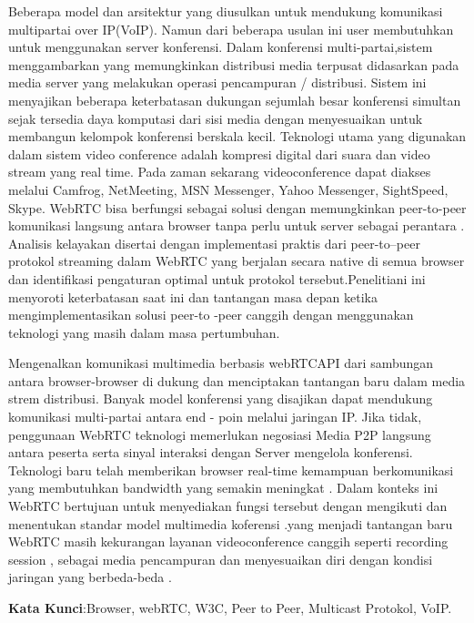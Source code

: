 \documentclass{jtetiproposalskripsi}
\begin{document}
\cover

\approvalpage


\begin{abstractind}
Beberapa model dan arsitektur yang diusulkan untuk mendukung komunikasi multipartai over IP(VoIP). Namun dari beberapa usulan ini user membutuhkan untuk menggunakan server konferensi. Dalam konferensi multi-partai,sistem menggambarkan yang memungkinkan distribusi media terpusat didasarkan pada media server yang melakukan operasi pencampuran / distribusi. Sistem ini menyajikan beberapa keterbatasan dukungan sejumlah besar konferensi simultan sejak tersedia daya komputasi  dari sisi media dengan menyesuaikan untuk membangun kelompok konferensi berskala kecil. Teknologi utama yang digunakan dalam sistem video conference adalah kompresi digital dari suara dan video stream yang real time. Pada zaman sekarang videoconference dapat diakses melalui Camfrog, NetMeeting, MSN Messenger, Yahoo Messenger, SightSpeed, Skype. WebRTC bisa berfungsi sebagai solusi dengan memungkinkan peer-to-peer komunikasi langsung antara browser tanpa perlu untuk server sebagai perantara . Analisis kelayakan disertai dengan implementasi praktis dari peer-to–peer protokol streaming dalam WebRTC yang berjalan secara native di semua browser dan identifikasi pengaturan optimal untuk protokol tersebut.Penelitiani ini menyoroti keterbatasan saat ini dan tantangan masa depan ketika mengimplementasikan solusi peer-to -peer canggih dengan menggunakan teknologi yang masih dalam masa pertumbuhan.

Mengenalkan komunikasi multimedia berbasis webRTCAPI dari sambungan antara browser-browser di dukung dan menciptakan tantangan baru dalam media strem distribusi. Banyak model konferensi  yang disajikan dapat mendukung komunikasi multi-partai antara end - poin melalui jaringan IP. Jika tidak, penggunaan WebRTC teknologi memerlukan negosiasi Media P2P langsung antara peserta serta sinyal interaksi dengan Server mengelola konferensi. Teknologi baru telah memberikan browser real-time kemampuan berkomunikasi yang  membutuhkan bandwidth yang semakin meningkat . Dalam konteks ini WebRTC bertujuan untuk menyediakan fungsi tersebut dengan mengikuti dan menentukan standar model multimedia koferensi .yang menjadi tantangan baru WebRTC masih kekurangan layanan videoconference canggih seperti recording session , sebagai media pencampuran dan menyesuaikan diri dengan kondisi jaringan yang berbeda-beda . 

\bigskip
\textbf{Kata Kunci}:Browser, webRTC, W3C, Peer to Peer, Multicast Protokol, VoIP.
\end{abstractind}
\end{document}
